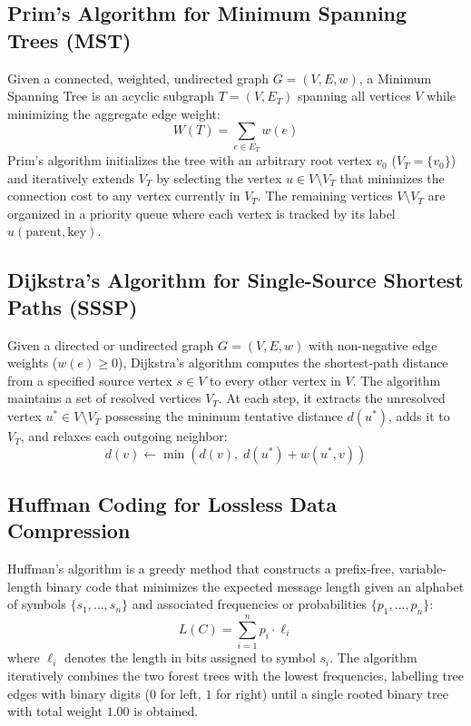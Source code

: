 \documentclass[11pt,a4paper]{article}
\begin{document}
\subsection{Prim's Algorithm for Minimum Spanning Trees (MST)}
Given a connected, weighted, undirected graph $G = (V, E, w)$, a Minimum Spanning Tree is an acyclic subgraph $T = (V, E_T)$ spanning all vertices $V$ while minimizing the aggregate edge weight:
\begin{equation}
    W(T) = \sum_{e \in E_T} w(e)
\end{equation}
Prim's algorithm initializes the tree with an arbitrary root vertex $v_0$ ($V_T = \{v_0\}$) and iteratively extends $V_T$ by selecting the vertex $u \in V \setminus V_T$ that minimizes the connection cost to any vertex currently in $V_T$. The remaining vertices $V \setminus V_T$ are organized in a priority queue where each vertex is tracked by its label $u(\text{parent}, \text{key})$.

\subsection{Dijkstra's Algorithm for Single-Source Shortest Paths (SSSP)}
Given a directed or undirected graph $G = (V, E, w)$ with non-negative edge weights ($w(e) \ge 0$), Dijkstra's algorithm computes the shortest-path distance from a specified source vertex $s \in V$ to every other vertex in $V$. The algorithm maintains a set of resolved vertices $V_T$. At each step, it extracts the unresolved vertex $u^* \in V \setminus V_T$ possessing the minimum tentative distance $d(u^*)$, adds it to $V_T$, and relaxes each outgoing neighbor:
\begin{equation}
    d(v) \leftarrow \min \left( d(v), \; d(u^*) + w(u^*, v) \right)
\end{equation}

\subsection{Huffman Coding for Lossless Data Compression}
Huffman's algorithm is a greedy method that constructs a prefix-free, variable-length binary code that minimizes the expected message length given an alphabet of symbols $\{s_1, \dots, s_n\}$ and associated frequencies or probabilities $\{p_1, \dots, p_n\}$:
\begin{equation}
    L(C) = \sum_{i=1}^n p_i \cdot \ell_i
\end{equation}
where $\ell_i$ denotes the length in bits assigned to symbol $s_i$. The algorithm iteratively combines the two forest trees with the lowest frequencies, labelling tree edges with binary digits ($0$ for left, $1$ for right) until a single rooted binary tree with total weight $1.00$ is obtained.
\end{document}
